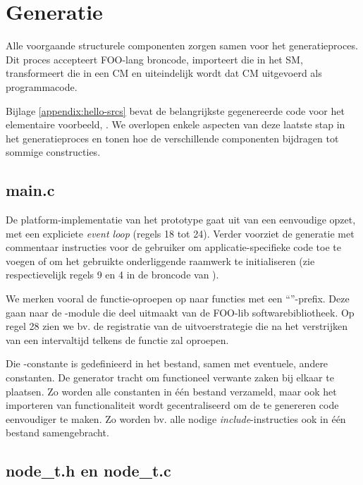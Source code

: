 
\section{Generatie}
\label{section:generation}

Alle voorgaande structurele componenten zorgen samen voor het generatieproces.
Dit proces accepteert FOO-lang broncode, importeert die in het SM,
transformeert die in een CM en uiteindelijk wordt dat CM uitgevoerd als
programmacode.

Bijlage \ref{appendix:hello-srcs} bevat de belangrijkste gegenereerde code voor
het elementaire voorbeeld, . We overlopen enkele aspecten van
deze laatste stap in het generatieproces en tonen hoe de verschillende
componenten bijdragen tot sommige constructies.

\subsection{main.c}

De platform-implementatie van het prototype gaat uit van een eenvoudige opzet,
met een expliciete \emph{event loop} (regels 18 tot 24). Verder voorziet de
generatie met commentaar instructies voor de gebruiker om applicatie-specifieke
code toe te voegen of om het gebruikte onderliggende raamwerk te initialiseren
(zie respectievelijk regels 9 en 4 in de broncode van ).

We merken vooral de functie-oproepen op naar functies met een
``''-prefix. Deze gaan naar de -module die deel
uitmaakt van de FOO-lib softwarebibliotheek. Op regel 28 zien we bv. de
registratie van de uitvoerstrategie die na het verstrijken van een intervaltijd
telkens de functie  zal oproepen.

Die -constante is gedefinieerd in het  bestand,
samen met eventuele, andere constanten. De generator tracht om functioneel
verwante zaken bij elkaar te plaatsen. Zo worden alle constanten in \'e\'en
bestand verzameld, maar ook het importeren van functionaliteit wordt
gecentraliseerd om de te genereren code eenvoudiger te maken. Zo worden bv.
alle nodige \emph{include}-instructies ook in \'e\'en  bestand
samengebracht.

\subsection{node\_t.h en node\_t.c}

